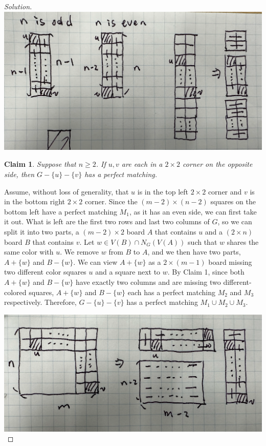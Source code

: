 \documentclass{article}
\newtheorem{claim}[thm]{Claim}
\begin{document}
\begin{enumerate}[label=(\alph*)]
\begin{proof}[Solution]
            \includegraphics[width=\textwidth]{Q382b1}
        \begin{claim}
            Suppose that $n \geq 2$. If $u, v$ are each in a $2 \times 2$ corner on the opposite side, then $G - \{u\} - \{v\}$ has a perfect matching.
        \end{claim}
        Assume, without loss of generality, that $u$ is in the top left $2 \times 2$ corner and $v$ is in the bottom right $2 \times 2$ corner. Since the $(m - 2) \times (n - 2)$ squares on the bottom left have a perfect matching $M_1$, as it has an even side, we can first take it out. What is left are the first two rows and last two columns of $G$, so we can split it into two parts, a $(m - 2) \times 2$ board $A$ that contains $u$ and a $(2 \times n)$ board $B$ that contains $v$. Let $w \in V(B) \cap N_G(V(A))$ such that $w$ shares the same color with $u$. We remove $w$ from $B$ to $A$, and we then have two parts, $A + \{w\}$ and $B - \{w\}$. We can view $A + \{w\}$ as a $2 \times (m - 1)$ board missing two different color squares $u$ and a square next to $w$. By Claim 1, since both $A + \{w\}$ and $B - \{w\}$ have exactly two columns and are missing two different-colored squares, $A + \{w\}$ and $B - \{w\}$ each has a perfect matching $M_2$ and $M_3$ respectively. Therefore, $G -
        \{u\} - \{v\}$ has a perfect matching $M_1 \cup M_2 \cup M_3$.

        \includegraphics[width=\textwidth]{Q382b2}


\end{proof}
\end{enumerate}
\end{document}
